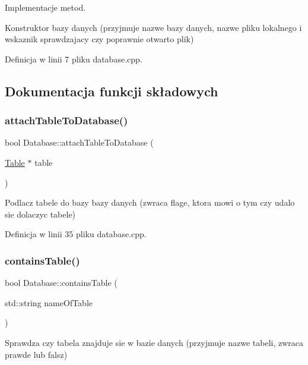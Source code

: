 Implementacje metod. 

Konstruktor bazy danych (przyjmuje nazwe bazy danych, nazwe pliku lokalnego i wskaznik sprawdzajacy czy poprawnie otwarto plik) 

Definicja w linii 7 pliku database.\+cpp.



\subsection{Dokumentacja funkcji składowych}
\mbox{\label{class_database_ac0427d3cb0807610d5b5d2c2e910d95c}} 
\subsubsection{\texorpdfstring{attach\+Table\+To\+Database()}{attachTableToDatabase()}}
{\footnotesize\ttfamily bool Database\+::attach\+Table\+To\+Database (\begin{DoxyParamCaption}\item[{\mbox{\hyperlink{class_table}{Table}} $\ast$}]{table }\end{DoxyParamCaption})}

Podlacz tabele do bazy bazy danych (zwraca flage, ktora mowi o tym czy udalo sie dolaczyc tabele) 

Definicja w linii 35 pliku database.\+cpp.

\mbox{\label{class_database_a8e8b77a7b47bc487e32f81bc34524e10}} 
\subsubsection{\texorpdfstring{contains\+Table()}{containsTable()}}
{\footnotesize\ttfamily bool Database\+::contains\+Table (\begin{DoxyParamCaption}\item[{std\+::string}]{name\+Of\+Table }\end{DoxyParamCaption})}

Sprawdza czy tabela znajduje sie w bazie danych (przyjmuje nazwe tabeli, zwraca prawde lub falsz) 

